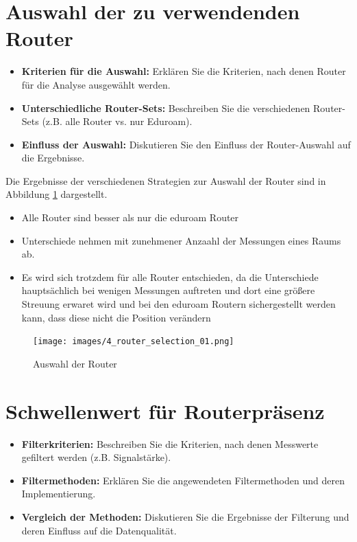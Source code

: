 \section{Auswahl der zu verwendenden Router}
\begin{itemize}
    \item \textbf{Kriterien für die Auswahl:} Erklären Sie die Kriterien, nach denen Router für die Analyse ausgewählt werden.
    \item \textbf{Unterschiedliche Router-Sets:} Beschreiben Sie die verschiedenen Router-Sets (z.B. alle Router vs. nur Eduroam).
    \item \textbf{Einfluss der Auswahl:} Diskutieren Sie den Einfluss der Router-Auswahl auf die Ergebnisse.
\end{itemize}

Die Ergebnisse der verschiedenen Strategien zur Auswahl der Router sind in Abbildung \ref{fig:4_router_selection_01} dargestellt.

\begin{itemize}
    \item Alle Router sind besser als nur die eduroam Router
    \item Unterschiede nehmen mit zunehmener Anzaahl der Messungen eines Raums ab.
    \item Es wird sich trotzdem für alle Router entschieden, da die Unterschiede hauptsächlich bei wenigen Messungen auftreten und dort eine größere Streuung erwaret wird und bei den eduroam Routern sichergestellt werden kann, dass diese nicht die Position verändern 
\end{itemize}    

\begin{figure}[H]
    \centering
    \texttt{[image: images/4\_router\_selection\_01.png]}
    \caption{Auswahl der Router}
    \label{fig:4_router_selection_01}
\end{figure}

\section{Schwellenwert für Routerpräsenz}
\begin{itemize}
    \item \textbf{Filterkriterien:} Beschreiben Sie die Kriterien, nach denen Messwerte gefiltert werden (z.B. Signalstärke).
    \item \textbf{Filtermethoden:} Erklären Sie die angewendeten Filtermethoden und deren Implementierung.
    \item \textbf{Vergleich der Methoden:} Diskutieren Sie die Ergebnisse der Filterung und deren Einfluss auf die Datenqualität.
\end{itemize}

